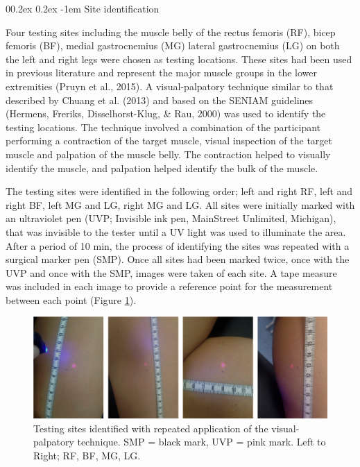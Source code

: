 \documentclass[
  english,
  man,floatsintext]{apa6}
\makeatletter
\renewcommand{\paragraph}{\@startsection{paragraph}{4}{\parindent}%
  {0\baselineskip \@plus 0.2ex \@minus 0.2ex}%
  {-1em}%
  {\normalfont\normalsize\bfseries\itshape\typesectitle}}
\makeatother
\begin{document}
\hypertarget{site-identification}{%
\paragraph{Site identification}\label{site-identification}}

Four testing sites including the muscle belly of the rectus femoris (RF), bicep femoris (BF), medial gastrocnemius (MG) lateral gastrocnemius (LG) on both the left and right legs were chosen as testing locations. These sites had been used in previous literature and represent the major muscle groups in the lower extremities (Pruyn et al., 2015).
A visual-palpatory technique similar to that described by Chuang et al. (2013) and based on the SENIAM guidelines (Hermens, Freriks, Disselhorst-Klug, \& Rau, 2000) was used to identify the testing locations.
The technique involved a combination of the participant performing a contraction of the target muscle, visual inspection of the target muscle and palpation of the muscle belly.
The contraction helped to visually identify the muscle, and palpation helped identify the bulk of the muscle.

The testing sites were identified in the following order; left and right RF, left and right BF, left MG and LG, right MG and LG.
All sites were initially marked with an ultraviolet pen (UVP; Invisible ink pen, MainStreet Unlimited, Michigan), that was invisible to the tester until a UV light was used to illuminate the area.
After a period of 10 min, the process of identifying the sites was repeated with a surgical marker pen (SMP).
Once all sites had been marked twice, once with the UVP and once with the SMP, images were taken of each site.
A tape measure was included in each image to provide a reference point for the measurement between each point (Figure \ref{fig:test-sites}).

\begin{figure}[H]

{\centering \includegraphics[width=1\linewidth]{figs/measures/examples} 

}

\caption{Testing sites identified with repeated application of the visual-palpatory technique. SMP = black mark, UVP = pink mark. Left to Right; RF, BF, MG, LG.}\label{fig:test-sites}
\end{figure}
\end{document}
